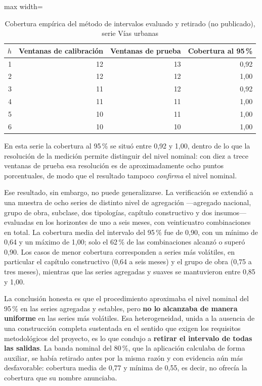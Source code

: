 \documentclass[12pt,letterpaper]{article}
\begin{document}
\begin{table}[H]
\centering
\caption{Cobertura empírica del método de intervalos evaluado y retirado (no publicado), serie Vías urbanas}
\label{tab:cobertura_empirica_icociv}
\vspace{\baselineskip}
\scriptsize
\begin{adjustbox}{max width=\textwidth}
\begin{tabular}{rrrr}
\toprule
\textbf{\(h\)} & \textbf{Ventanas de calibración} & \textbf{Ventanas de prueba} & \textbf{Cobertura al 95\,\%} \\
\midrule
1 & 12 & 13 & 0,92 \\
2 & 12 & 12 & 1,00 \\
3 & 11 & 12 & 0,92 \\
4 & 11 & 11 & 1,00 \\
5 & 10 & 11 & 1,00 \\
6 & 10 & 10 & 1,00 \\
\bottomrule
\end{tabular}
\end{adjustbox}
\end{table}

En esta serie la cobertura al 95\,\% se situó entre 0,92 y 1,00, dentro de lo que la resolución de la medición permite distinguir del nivel nominal: con diez a trece ventanas de prueba esa resolución es de aproximadamente ocho puntos porcentuales, de modo que el resultado tampoco \emph{confirma} el nivel nominal.

Ese resultado, sin embargo, no puede generalizarse. La verificación se extendió a una muestra de ocho series de distinto nivel de agregación ---agregado nacional, grupo de obra, subclase, dos tipologías, capítulo constructivo y dos insumos--- evaluadas en los horizontes de uno a seis meses, con veinticuatro combinaciones en total. La cobertura media del intervalo del 95\,\% fue de 0,90, con un mínimo de 0,64 y un máximo de 1,00; solo el 62\,\% de las combinaciones alcanzó o superó 0,90. Los casos de menor cobertura corresponden a series más volátiles, en particular el capítulo constructivo (0,64 a seis meses) y el grupo de obra (0,75 a tres meses), mientras que las series agregadas y suaves se mantuvieron entre 0,85 y 1,00.

La conclusión honesta es que el procedimiento aproximaba el nivel nominal del 95\,\% en las series agregadas y estables, pero \textbf{no lo alcanzaba de manera uniforme} en las series más volátiles. Esa heterogeneidad, unida a la ausencia de una construcción completa sustentada en el sentido que exigen los requisitos metodológicos del proyecto, es lo que condujo a \textbf{retirar el intervalo de todas las salidas}. La banda nominal del 80\,\%, que la aplicación calculaba de forma auxiliar, se había retirado antes por la misma razón y con evidencia aún más desfavorable: cobertura media de 0,77 y mínima de 0,55, es decir, no ofrecía la cobertura que su nombre anunciaba.
\end{document}
